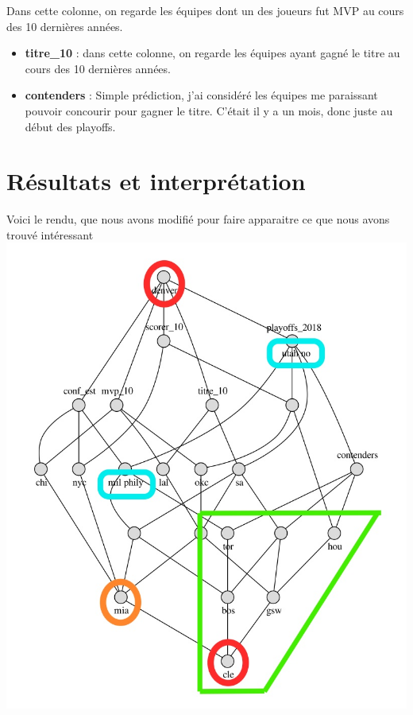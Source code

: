\documentclass[a4paper,11pt]{article}
\begin{document}
Dans cette colonne, on regarde les équipes dont un des joueurs fut MVP au cours des 10 dernières années. \\

\begin{itemize}
\item \textbf{titre\_10} : dans cette colonne, on regarde les équipes ayant gagné le titre au cours des 10 dernières années. \\

\item \textbf{contenders} : Simple prédiction, j'ai considéré les équipes me paraissant pouvoir concourir pour gagner le titre. C'était il y a un mois, donc juste au début des playoffs. \\
\end{itemize}

\section{Résultats et interprétation}
\label{sec-3}

Voici le rendu, que nous avons modifié pour faire apparaitre ce que nous avons trouvé intéressant \\

\includegraphics[width=.9\linewidth]{./img/rendu_annote.jpg} \\
\end{document}
